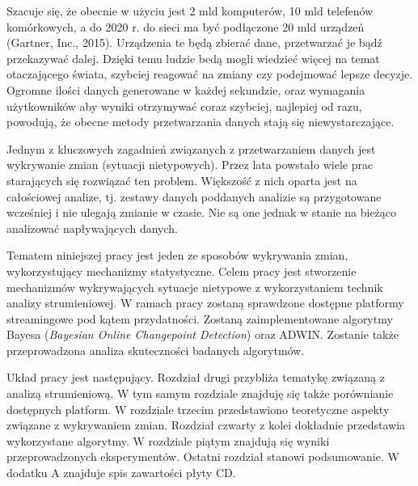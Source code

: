 Szacuje się,
że obecnie w użyciu jest 2 mld komputerów,
10 mld telefenów komórkowych,
a do 2020 r. do sieci ma być podłączone 20 mld urządzeń (Gartner, Inc., 2015).
Urządzenia te będą zbierać dane,
przetwarzać je
bądź przekazywać dalej.
Dzięki temu ludzie bedą mogli wiedzieć więcej na temat otaczającego świata,
szybciej reagować na zmiany
czy podejmować lepsze decyzje.
Ogromne ilości danych generowane w każdej sekundzie,
oraz wymagania użytkowników aby wyniki otrzymywać coraz szybciej,
najlepiej od razu,
powodują,
że obecne metody przetwarzania danych stają się niewystarczające.

Jednym z kluczowych zagadnień związanych z przetwarzaniem danych jest wykrywanie zmian (sytuacji nietypowych).
Przez lata powstało wiele prac starających się rozwiązać ten problem.
Większość z nich oparta jest na całościowej analize,
tj. zestawy danych poddanych analizie są przygotowane wcześniej i nie ulegają zmianie w czasie.
Nie są one jednak w stanie na bieżąco analizować napływających danych.

Tematem niniejszej pracy jest jeden ze sposobów wykrywania zmian,
wykorzystujący mechanizmy statystyczne.
Celem pracy jest stworzenie mechanizmów wykrywających sytuacje nietypowe
z wykorzystaniem technik analizy strumieniowej.
W ramach pracy zostaną sprawdzone dostępne platformy streamingowe pod kątem przydatności.
Zostaną zaimplementowane algorytmy Bayesa (\textit{Bayesian Online Changepoint Detection})
oraz ADWIN.
Zostanie także przeprowadzona analiza skuteczności badanych algorytmów.

Układ pracy jest następujący.
Rozdział drugi przybliża tematykę związaną z analizą strumieniową.
W tym samym rozdziale znajduję się także porównianie dostępnych platform.
W rozdziale trzecim przedstawiono teoretyczne aspekty związane z wykrywaniem zmian.
Rozdział czwarty z kolei dokładnie przedstawia wykorzystane algorytmy.
W rozdziale piątym znajdują się wyniki przeprowadzonych eksperymentów.
Ostatni rozdział stanowi podsumowanie.
W dodatku A znajduje spis zawartości płyty CD.
